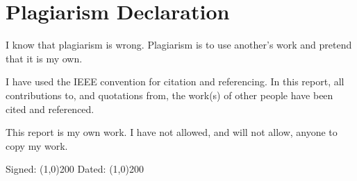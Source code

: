 \chapter*{Plagiarism Declaration}
I know that plagiarism is wrong. Plagiarism is to use another's work and pretend that it is my own.

I have used the IEEE convention for citation and referencing. In this report, all contributions to, and quotations from, the work(s) of other people have been cited and referenced. 

This report is my own work. I have not allowed, and will not allow, anyone to copy my work.
\vskip100pt
\begin{center}
	Signed: \line(1,0){200}
	\vskip20pt
	Dated: \line(1,0){200}
\end{center}

\newpage